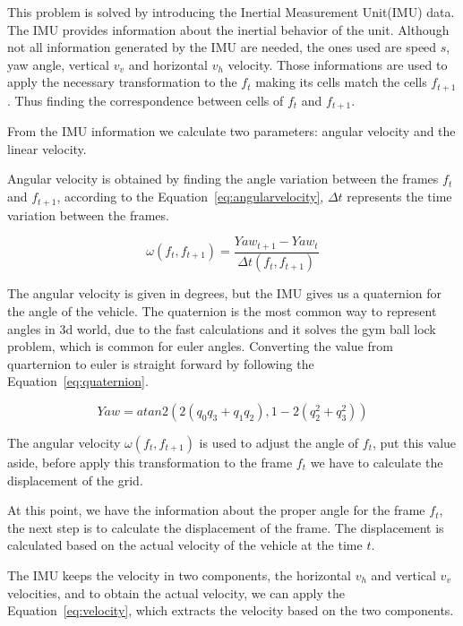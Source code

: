 This problem is solved by introducing the Inertial Measurement Unit(IMU) data. The IMU provides information about the inertial behavior of the unit. Although not all information generated by the IMU are needed, the ones used are speed $s$, yaw angle, vertical $v_v$ and horizontal $v_h$ velocity. Those informations are used to apply the necessary transformation to the $f_t$ making its cells match the cells $f_{t+1}$. Thus finding the correspondence between cells of $f_t$ and $f_{t+1}$.

From the IMU information we calculate two parameters: angular velocity and the linear velocity. 

Angular velocity is obtained by finding the angle variation between the frames $f_t$ and $f_{t+1}$, according to the Equation~\ref{eq:angularvelocity}, $\Delta t$ represents the time variation between the frames.

\begin{equation}
\label{eq:angularvelocity}
\omega(f_t,f_{t+1}) = \frac{Yaw_{t+1}-Yaw_t}{\Delta t(f_t,f_{t+1})} 
\end{equation} 

The angular velocity is given in degrees, but the IMU gives us a quaternion for the angle of the vehicle. The quaternion is the most common way to represent angles in 3d world, due to the fast calculations and it solves the gym ball lock problem, which is common for euler angles. Converting the value from quarternion to euler is straight forward by following the Equation~\ref{eq:quaternion}.

\begin{equation}
\label{eq:quaternion}
Yaw=atan2(2(q_0 q_3+q_1 q_2),1-2(q_2^2+q_3^2))
\end{equation}

The angular velocity $\omega(f_t,f_{t+1})$ is used to adjust the angle of $f_t$, put this value aside, before apply this transformation to the frame $f_t$ we have to calculate the displacement of the grid.

At this point, we have the information about the proper angle for the frame $f_t$, the next step is to calculate the displacement of the frame. The displacement is calculated based on the actual velocity of the vehicle at the time $t$. 

The IMU keeps the velocity in two components, the horizontal $v_h$ and vertical $v_v$ velocities, and to obtain the actual velocity, we can apply the Equation~\ref{eq:velocity}, which extracts the velocity based on the two components.

